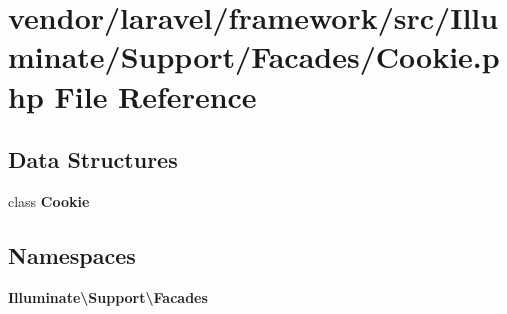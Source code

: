 \section{vendor/laravel/framework/src/\+Illuminate/\+Support/\+Facades/\+Cookie.php File Reference}
\label{laravel_2framework_2src_2_illuminate_2_support_2_facades_2_cookie_8php}
\subsection*{Data Structures}
\begin{DoxyCompactItemize}
\item 
class {\bf Cookie}
\end{DoxyCompactItemize}
\subsection*{Namespaces}
\begin{DoxyCompactItemize}
\item 
 {\bf Illuminate\textbackslash{}\+Support\textbackslash{}\+Facades}
\end{DoxyCompactItemize}
